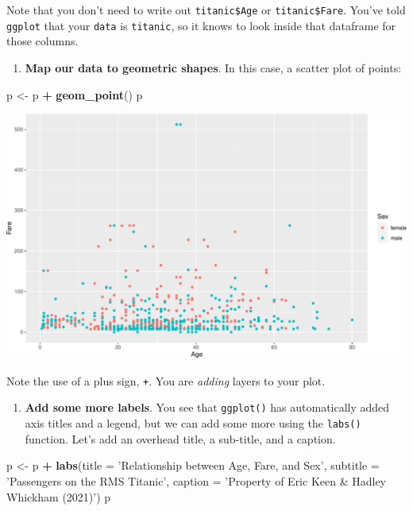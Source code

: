\documentclass[]{book}
\newenvironment{Shaded}{\begin{snugshade}}{\end{snugshade}}
\newcommand{\DataTypeTok}[1]{\textcolor[rgb]{0.13,0.29,0.53}{#1}}
\newcommand{\KeywordTok}[1]{\textcolor[rgb]{0.13,0.29,0.53}{\textbf{#1}}}
\newcommand{\NormalTok}[1]{#1}
\newcommand{\OperatorTok}[1]{\textcolor[rgb]{0.81,0.36,0.00}{\textbf{#1}}}
\newcommand{\StringTok}[1]{\textcolor[rgb]{0.31,0.60,0.02}{#1}}
\providecommand{\tightlist}{%
  \setlength{\itemsep}{0pt}\setlength{\parskip}{0pt}}
\begin{document}
Note that you don't need to write out \texttt{titanic\$Age} or \texttt{titanic\$Fare}. You've told \texttt{ggplot} that your \texttt{data} is \texttt{titanic}, so it knows to look inside that dataframe for those columns.

\begin{enumerate}
\def\labelenumi{(\arabic{enumi})}
\setcounter{enumi}{3}
\tightlist
\item
  \textbf{Map our data to geometric shapes}. In this case, a scatter plot of points:
\end{enumerate}

\begin{Shaded}
\begin{Highlighting}[]
\NormalTok{p <-}\StringTok{ }\NormalTok{p }\OperatorTok{+}\StringTok{ }\KeywordTok{geom_point}\NormalTok{()}
\NormalTok{p}
\end{Highlighting}
\end{Shaded}

\includegraphics{figures/unnamed-chunk-251-1.pdf}

Note the use of a plus sign, \texttt{+}. You are \emph{adding} layers to your plot.

\begin{enumerate}
\def\labelenumi{(\arabic{enumi})}
\setcounter{enumi}{4}
\tightlist
\item
  \textbf{Add some more labels}. You see that \texttt{ggplot()} has automatically added axis titles and a legend, but we can add some more using the \texttt{labs()} function. Let's add an overhead title, a sub-title, and a caption.
\end{enumerate}

\begin{Shaded}
\begin{Highlighting}[]
\NormalTok{p <-}\StringTok{ }\NormalTok{p }\OperatorTok{+}\StringTok{ }\KeywordTok{labs}\NormalTok{(}\DataTypeTok{title =} \StringTok{'Relationship between Age, Fare, and Sex'}\NormalTok{,}
              \DataTypeTok{subtitle =} \StringTok{'Passengers on the RMS Titanic'}\NormalTok{,}
              \DataTypeTok{caption =} \StringTok{'Property of Eric Keen & Hadley Whickham (2021)'}\NormalTok{)}
\NormalTok{p}
\end{Highlighting}
\end{Shaded}
\end{document}
